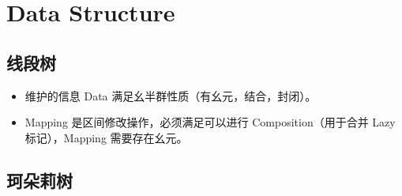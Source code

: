 \section{Data Structure}

\subsection{}

\subsection{线段树}
\begin{itemize}
    \item 维护的信息 Data 满足幺半群性质（有幺元，结合，封闭）。
    \item Mapping 是区间修改操作，必须满足可以进行 Composition（用于合并 Lazy 标记），Mapping 需要存在幺元。
\end{itemize}




\subsection{珂朵莉树}
